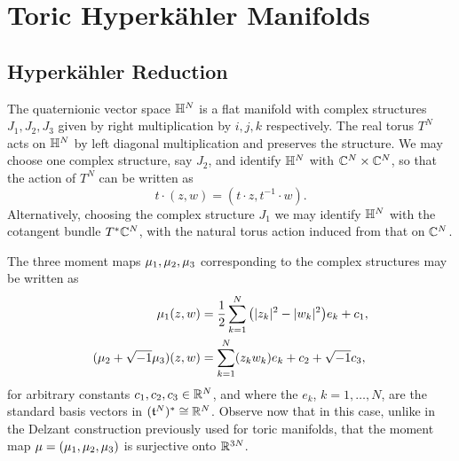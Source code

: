 \chapter{Toric Hyperk{\"a}hler Manifolds}

\section{Hyperk{\"a}hler Reduction}

The quaternionic vector space $\mathbb{H}^{N}$ is a flat \HK manifold with complex structures $J_{1}, J_{2}, J_{3}$ given by right multiplication by $i, j, k$ respectively. The real torus $T^{N}$ acts on $\mathbb{H}^{N}$ by left diagonal multiplication and preserves the \HK structure. We may choose one complex structure, say $J_{2}$, and identify $\mathbb{H}^{N}$ with $\mathbb{C}^{N} \times \mathbb{C}^{N}$, so that the action of $T^{N}$ can be written as
\begin{equation*}
	t\cdot (z,w) = (t\cdot z, t^{-1} \cdot w).
\end{equation*}
Alternatively, choosing the complex structure $J_{1}$ we may identify $\mathbb{H}^{N}$ with the cotangent bundle $T^{\ast}\mathbb{C}^{N}$, with the natural torus action induced from that on $\mathbb{C}^{N}$.

The three moment maps $\mu_{1}, \mu_{2}, \mu_{3}$ corresponding to the complex structures may be written as
\begin{equation*}
	\begin{split}
		\mu_{1}(z,w) &= \frac{1}{2}\sum_{k=1}^{N}\big( |z_{k}|^{2} - |w_{k}|^{2} \big) e_{k} + c_{1},\\
		(\mu_{2} + \sqrt{-1}\mu_{3} )(z,w) &= \sum_{k=1}^{N}(z_{k}w_{k})e_{k} + c_{2} + \sqrt{-1}c_{3},
	\end{split}
\end{equation*}
for arbitrary constants $c_{1}, c_{2}, c_{3} \in \mathbb{R}^{N}$, and where the $e_{k}$, $k = 1, \ldots, N$, are the standard basis vectors in $(\mathfrak{t}^{N})^{\ast} \cong \mathbb{R}^{N}$. Observe now that in this case, unlike in the Delzant construction previously used for toric manifolds, that the \HK moment map $\mu = (\mu_{1}, \mu_{2}, \mu_{3})$ is surjective onto $\mathbb{R}^{3N}$.

